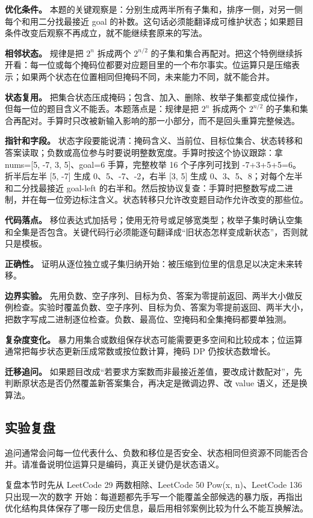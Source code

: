 \textbf{优化条件。} 本题的关键观察是：分别生成两半所有子集和，排序一侧，对另一侧每个和用二分找最接近 goal 的补数。这句话必须能翻译成可维护状态；如果题目条件改变后观察不再成立，就不能继续套原来的写法。

\textbf{相邻状态。} 规律是把 \ensuremath{2^{n}} 拆成两个 \ensuremath{2^{n/2}} 的子集和集合再配对。把这个特例继续拆开看：每一位或每个掩码位都要对应题目里的一个布尔事实。位运算只是压缩表示；如果两个状态在位置相同但掩码不同，未来能力不同，就不能合并。

\textbf{状态复用。} 把集合状态压成掩码；包含、加入、删除、枚举子集都变成位操作，但每一位的题目含义不能丢。本题落点是：规律是把 \ensuremath{2^{n}} 拆成两个 \ensuremath{2^{n/2}} 的子集和集合再配对。手算时只改被新输入影响的那一小部分，而不是回头重算完整候选。

\textbf{指针和字段。} 状态字段要能说清：掩码含义、当前位、目标位集合、状态转移和答案读取；负数或高位参与时要说明整数宽度。手算时按这个协议跟踪：拿 nums=[5, -7, 3, 5]、goal=6 手算，完整枚举 16 个子序列可找到 -7+3+5+5=6。折半后左半 [5, -7] 生成 0、5、-7、-2，右半 [3, 5] 生成 0、3、5、8；对每个左半和二分找最接近 goal-left 的右半和。然后按协议复查：手算时把整数写成二进制，并在每一位旁边标注含义。状态转移只允许改变题目动作允许改变的那些位。

\textbf{代码落点。} 移位表达式加括号；使用无符号或足够宽类型；枚举子集时确认空集和全集是否包含。关键代码行必须能逐句翻译成“旧状态怎样变成新状态”，否则就只是模板。

\textbf{正确性。} 证明从逐位独立或子集归纳开始：被压缩到位里的信息足以决定未来转移。

\textbf{边界实验。} 先用负数、空子序列、目标为负、答案为零提前返回、两半大小做反例检查。实验时覆盖负数、空子序列、目标为负、答案为零提前返回、两半大小，把数字写成二进制逐位检查。负数、最高位、空掩码和全集掩码都要单独测。

\textbf{复杂度变化。} 暴力用集合或数组保存状态可能需要更多空间和比较成本；位运算通常把每步状态更新压成常数或按位数计算，掩码 DP 仍按状态数增长。

\textbf{迁移追问。} 如果题目改成“若要求方案数而非最接近差值，要改成计数配对”，先判断原状态是否仍然覆盖新答案集合，再决定是微调边界、改 value 语义，还是换算法。

\subsection{实验复盘}

追问通常会问每一位代表什么、负数和移位是否安全、状态相同但资源不同能否合并。请准备说明位运算只是编码，真正关键仍是状态语义。

复盘本节时先从 LeetCode 29 两数相除、LeetCode 50 Pow(x, n)、LeetCode 136 只出现一次的数字 开始：每道题都先手写一个能覆盖全部候选的暴力版，再指出优化结构具体保存了哪一段历史信息，最后用相邻案例比较为什么不能互换解法。
